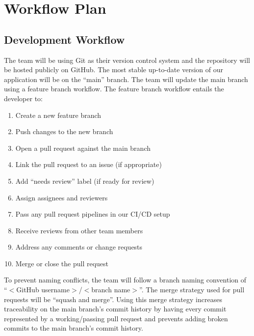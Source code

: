 \documentclass{article}
\begin{document}
\section{Workflow Plan}


\subsection{Development Workflow}

The team will be using Git as their version control system and the repository will be hosted
publicly on GitHub. The most stable up-to-date version of our application will be on the ``main''
branch. The team will update the main branch using a feature branch workflow. The feature branch
workflow entails the developer to:

\begin{enumerate}
  \item Create a new feature branch
  \item Push changes to the new branch
  \item Open a pull request against the main branch
  \item Link the pull request to an issue (if appropriate)
  \item Add ``needs review'' label (if ready for review)
  \item Assign assignees and reviewers
  \item Pass any pull request pipelines in our CI/CD setup
  \item Receive reviews from other team members
  \item Address any comments or change requests
  \item Merge or close the pull request
\end{enumerate}

To prevent naming conflicts, the team will follow a branch naming convention of
``$<$GitHub username$>$/$<$branch name$>$''. The merge strategy used for pull requests will be
``squash and merge''. Using this merge strategy increases traceability on the main branch's commit
history by having every commit represented by a working/passing pull request and prevents adding
broken commits to the main branch's commit history.
\end{document}
